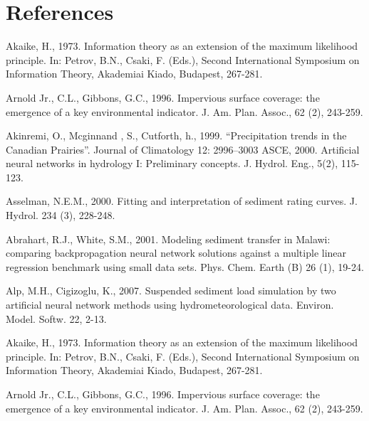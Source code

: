 \setlength\parindent{0pt}

\chapter*{References}

\newenvironment{hangingpar}[1]
  {\begin{list}
          {}
          {\setlength{\itemindent}{-#1}%
           \setlength{\leftmargin}{#1}%
           \setlength{\itemsep}{0pt}%
           \setlength{\parsep}{\parskip}%
           \setlength{\topsep}{\parskip}%
           }
    \setlength{\parindent}{-#1}%
    \item[]
  }
  {\end{list}}


\begin{hangingpar}{2em}
Akaike, H., 1973. Information theory as an extension of the maximum likelihood principle. In: Petrov, B.N., Csaki, F. (Eds.), Second International Symposium on Information Theory, Akademiai Kiado, Budapest, 267-281.

Arnold Jr., C.L., Gibbons, G.C., 1996. Impervious surface coverage: the emergence of a key environmental indicator. J. Am. Plan. Assoc., 62 (2), 243-259.

Akinremi, O., Mcginnand , S., Cutforth, h., 1999. ``Precipitation trends in the Canadian Prairies''. Journal of Climatology 12: 2996–3003
ASCE, 2000. Artificial neural networks in hydrology I: Preliminary concepts. J. Hydrol. Eng., 5(2), 115-123.

Asselman, N.E.M., 2000. Fitting and interpretation of sediment rating curves. J. Hydrol. 234 (3), 228-248.

Abrahart, R.J., White, S.M., 2001. Modeling sediment transfer in Malawi: comparing backpropagation neural network solutions against a multiple linear regression benchmark using small data sets. Phys. Chem. Earth (B) 26 (1), 19-24.

Alp, M.H., Cigizoglu, K., 2007. Suspended sediment load simulation by two artificial neural network methods using hydrometeorological data. Environ. Model. Softw. 22, 2-13. 

Akaike, H., 1973. Information theory as an extension of the maximum likelihood principle. In: Petrov, B.N., Csaki, F. (Eds.), Second International Symposium on Information Theory, Akademiai Kiado, Budapest, 267-281.

Arnold Jr., C.L., Gibbons, G.C., 1996. Impervious surface coverage: the emergence of a key environmental indicator. J. Am. Plan. Assoc., 62 (2), 243-259.


\end{hangingpar}
